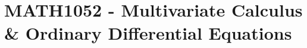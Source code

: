 \hypertarget{MATH1052}{\section{MATH1052 - Multivariate Calculus \& Ordinary Differential Equations}}
